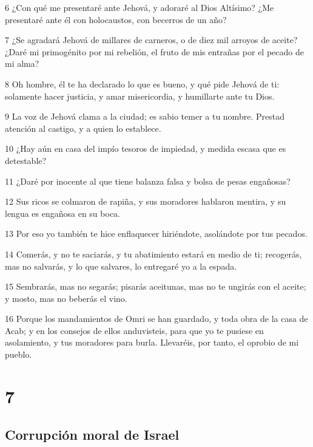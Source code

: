 \par 6 ¿Con qué me presentaré ante Jehová, y adoraré al Dios Altísimo? ¿Me presentaré ante él con holocaustos, con becerros de un año?
\par 7 ¿Se agradará Jehová de millares de carneros, o de diez mil arroyos de aceite? ¿Daré mi primogénito por mi rebelión, el fruto de mis entrañas por el pecado de mi alma?
\par 8 Oh hombre, él te ha declarado lo que es bueno, y qué pide Jehová de ti: solamente hacer justicia, y amar misericordia, y humillarte ante tu Dios.
\par 9 La voz de Jehová clama a la ciudad; es sabio temer a tu nombre. Prestad atención al castigo, y a quien lo establece.
\par 10 ¿Hay aún en casa del impío tesoros de impiedad, y medida escasa que es detestable?
\par 11 ¿Daré por inocente al que tiene balanza falsa y bolsa de pesas engañosas?
\par 12 Sus ricos se colmaron de rapiña, y sus moradores hablaron mentira, y su lengua es engañosa en su boca.
\par 13 Por eso yo también te hice enflaquecer hiriéndote, asolándote por tus pecados.
\par 14 Comerás, y no te saciarás, y tu abatimiento estará en medio de ti; recogerás, mas no salvarás, y lo que salvares, lo entregaré yo a la espada.
\par 15 Sembrarás, mas no segarás; pisarás aceitunas, mas no te ungirás con el aceite; y mosto, mas no beberás el vino.
\par 16 Porque los mandamientos de Omri se han guardado, y toda obra de la casa de Acab; y en los consejos de ellos anduvisteis, para que yo te pusiese en asolamiento, y tus moradores para burla. Llevaréis, por tanto, el oprobio de mi pueblo.

\chapter{7}

\section*{Corrupción moral de Israel}

